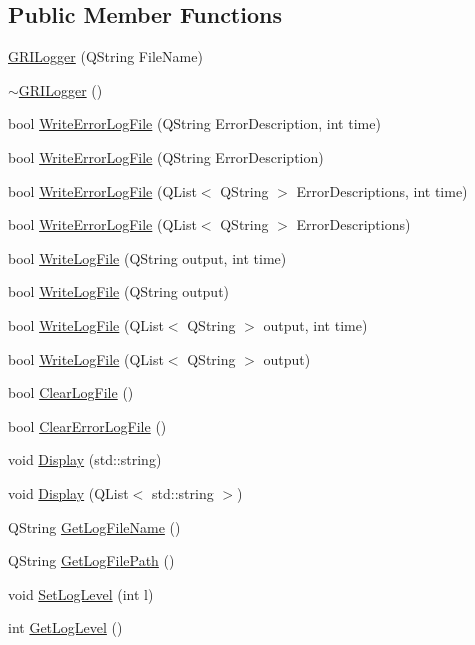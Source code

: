 \subsection*{\-Public \-Member \-Functions}
\begin{DoxyCompactItemize}
\item 
\hyperlink{classGRILogger_a5bc6e70b190b2b040e6d127ff67e1127}{\-G\-R\-I\-Logger} (\-Q\-String \-File\-Name)
\item 
\hyperlink{classGRILogger_ab9c62dacaebf90ad2c018b28c16b468a}{$\sim$\-G\-R\-I\-Logger} ()
\item 
bool \hyperlink{classGRILogger_ad0a66372098ce1a4467dd4a88b7d451d}{\-Write\-Error\-Log\-File} (\-Q\-String \-Error\-Description, int time)
\item 
bool \hyperlink{classGRILogger_a986af22eb17bc900501d5cee27bd7083}{\-Write\-Error\-Log\-File} (\-Q\-String \-Error\-Description)
\item 
bool \hyperlink{classGRILogger_a8c99342ac9b5e4aaedd0724b2c592a1a}{\-Write\-Error\-Log\-File} (\-Q\-List$<$ \-Q\-String $>$ \-Error\-Descriptions, int time)
\item 
bool \hyperlink{classGRILogger_ac5dfd784d8e6cc55057f886bd6c60411}{\-Write\-Error\-Log\-File} (\-Q\-List$<$ \-Q\-String $>$ \-Error\-Descriptions)
\item 
bool \hyperlink{classGRILogger_aabe86599899900ad403b391d92a82931}{\-Write\-Log\-File} (\-Q\-String output, int time)
\item 
bool \hyperlink{classGRILogger_a9251445c62908692afc80efca1b49a2d}{\-Write\-Log\-File} (\-Q\-String output)
\item 
bool \hyperlink{classGRILogger_ad1b6770a16ec00568376e2f931a318e3}{\-Write\-Log\-File} (\-Q\-List$<$ \-Q\-String $>$ output, int time)
\item 
bool \hyperlink{classGRILogger_a5350f24e3479833ac1500b22ca9a4285}{\-Write\-Log\-File} (\-Q\-List$<$ \-Q\-String $>$ output)
\item 
bool \hyperlink{classGRILogger_affd7b6afb8593583fa20c7f672c12394}{\-Clear\-Log\-File} ()
\item 
bool \hyperlink{classGRILogger_afc0bd7b5b18ab23bf20e49f5b248e52a}{\-Clear\-Error\-Log\-File} ()
\item 
void \hyperlink{classGRILogger_a95533a5302ccfc29c877a2318e0e708a}{\-Display} (std\-::string)
\item 
void \hyperlink{classGRILogger_a008dea4b6e32d6044ad7d5e9757424c9}{\-Display} (\-Q\-List$<$ std\-::string $>$)
\item 
\-Q\-String \hyperlink{classGRILogger_a3e2d8e4d4fd8ffa1a575efea60ce94fd}{\-Get\-Log\-File\-Name} ()
\item 
\-Q\-String \hyperlink{classGRILogger_a499b53b2be3e963c0deee633fcb76081}{\-Get\-Log\-File\-Path} ()
\item 
void \hyperlink{classGRILogger_a2d8ebeb8244906c6a187e4eb2cfd1cac}{\-Set\-Log\-Level} (int l)
\item 
int \hyperlink{classGRILogger_a356e46016eed231ce2134a551b791adb}{\-Get\-Log\-Level} ()
\end{DoxyCompactItemize}
